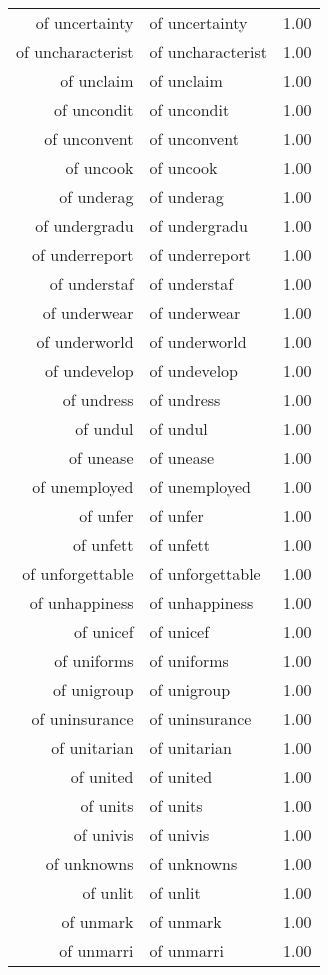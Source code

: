 \begin{table}[ht]
\begin{tabular}{rlr}
  of uncertainty & of uncertainty & 1.00 \\ 
  of uncharacterist & of uncharacterist & 1.00 \\ 
  of unclaim & of unclaim & 1.00 \\ 
  of uncondit & of uncondit & 1.00 \\ 
  of unconvent & of unconvent & 1.00 \\ 
  of uncook & of uncook & 1.00 \\ 
  of underag & of underag & 1.00 \\ 
  of undergradu & of undergradu & 1.00 \\ 
  of underreport & of underreport & 1.00 \\ 
  of understaf & of understaf & 1.00 \\ 
  of underwear & of underwear & 1.00 \\ 
  of underworld & of underworld & 1.00 \\ 
  of undevelop & of undevelop & 1.00 \\ 
  of undress & of undress & 1.00 \\ 
  of undul & of undul & 1.00 \\ 
  of unease & of unease & 1.00 \\ 
  of unemployed & of unemployed & 1.00 \\ 
  of unfer & of unfer & 1.00 \\ 
  of unfett & of unfett & 1.00 \\ 
  of unforgettable & of unforgettable & 1.00 \\ 
  of unhappiness & of unhappiness & 1.00 \\ 
  of unicef & of unicef & 1.00 \\ 
  of uniforms & of uniforms & 1.00 \\ 
  of unigroup & of unigroup & 1.00 \\ 
  of uninsurance & of uninsurance & 1.00 \\ 
  of unitarian & of unitarian & 1.00 \\ 
  of united & of united & 1.00 \\ 
  of units & of units & 1.00 \\ 
  of univis & of univis & 1.00 \\ 
  of unknowns & of unknowns & 1.00 \\ 
  of unlit & of unlit & 1.00 \\ 
  of unmark & of unmark & 1.00 \\ 
  of unmarri & of unmarri & 1.00 \\ 

\end{tabular}
\end{table}
